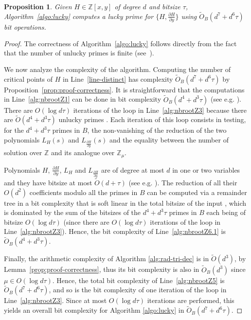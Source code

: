 \documentclass{sig-alternate}
\newtheorem{proposition}[theorem]{Proposition}
\newcommand {\Z}   {\mathbb Z}
\newcommand{\OO}{\ensuremath{{{O}}}}
\newcommand{\sO}{\ensuremath{\widetilde{{O}}}}
\newcommand{\sOB}{\ensuremath{\widetilde{{O}}_B}}
\newcommand{\blue}[1]{\color{blue}#1\color{black}\xspace}
\renewcommand{\blue}[1]{#1\xspace}
\begin{document}
\begin{proposition}\label{prop:comp-lucky}
Given $H\in\Z[x,y]$ of degree $d$ and bitsize $\tau$, 
Algorithm~\ref{algo:lucky} computes a lucky prime  for $\{H,\frac{\partial H}{\partial y} \}$ using $\sOB(d^7+d^6\tau)$ bit operations.
\end{proposition}
\begin{proof}
The correctness of Algorithm~\ref{algo:lucky} follows directly from the fact that the number of unlucky primes is finite 
(see~\blue{\cite[Prop. 13]{bouzidiJSC2014a}}). 

We now analyze the complexity of the algorithm. Computing the number of critical points of
$H$ in Line~\ref{line-distinct} has complexity $\sOB(d^7+d^6\tau)$ by
Proposition~\ref{prop:proof-correctness}.
It is
straightforward that the computations in Line~\ref{alg:nbrootZ1} can be done in bit complexity
$\sOB(d^4+d^3\tau)$ (see e.g. \blue{\cite[Lemma 7]{bouzidiJSC2014a}}). There are \blue{$\OO(\log d\tau)$} iterations of the loop in Line~\ref{alg:nbrootZ3} because there are
$\sO(d^4+d^3\tau)$ unlucky primes \blue{\cite[Prop. 13]{bouzidiJSC2014a}}. Each iteration of this loop consists in testing, for
the $d^4+d^3\tau$ 
primes in $B$, the non-vanishing of the reduction of the two polynomials
$L_H(s)$ and $L_{\frac{\partial H}{\partial y}}(s)$ and the equality between the number of
solution over $\Z$ and its analogue over $\Z_\mu$.



Polynomials $H$, $\frac{\partial H}{\partial y}$, $L_H$ and $L_\frac{\partial
H}{\partial y}$ are of degree at most $d$ in one or two variables and
they have bitsize at most $\sO(d+\tau)$ (see e.g. \blue{\cite[Lemma 7]{bouzidiJSC2014a}}).
The reduction of all their $O(d^2)$ coefficients modulo all the primes in $B$ can be computed via a remainder tree in a bit
  complexity that is soft linear in the total bitsize of the input
\cite[Thm. 1]{moenck1974}, which is dominated by the sum of the
    bitsizes of the $d^4+d^3\tau$ primes 
 in $B$ each being of bitsize
     \blue{$\OO(\log d\tau)$} (since there are \blue{$\OO(\log d\tau)$} iterations of the loop in Line~\ref{alg:nbrootZ3}). Hence, the bit complexity of  Line~\ref{alg:nbrootZ6.1} is~$\sOB(d^4+d^3\tau)$.

Finally, the arithmetic complexity of
     Algorithm \ref{alg:rad-tri-dec} is in $\sO(d^3)$, 
by Lemma~\ref{prop:proof-correctness},  thus its bit complexity is also in $\sOB(d^3)$
     since \blue{$\mu \in \OO(\log d\tau)$}.  Hence, the total bit complexity of Line~\ref{alg:nbrootZ5} is
     $\sOB(d^7+d^6\tau)$, and so is the bit complexity of one iteration of the loop in
     Line~\ref{alg:nbrootZ3}. Since at most \blue{$\OO(\log d\tau)$} iterations are performed, this yields an
     overall bit complexity for Algorithm \ref{algo:lucky} in $\sOB(d^7+d^6\tau)$.
\end{proof}
\end{document}
